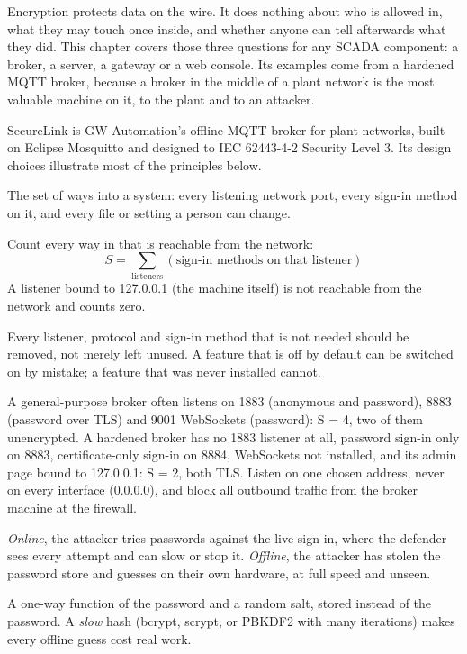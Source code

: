 Encryption protects data on the wire. It does nothing about who is allowed in, what they may touch once inside, and whether anyone can tell afterwards what they did. This chapter covers those three questions for any SCADA component: a broker, a server, a gateway or a web console. Its examples come from a hardened MQTT broker, because a broker in the middle of a plant network is the most valuable machine on it, to the plant and to an attacker.

 SecureLink is GW Automation's offline MQTT broker for plant networks, built on Eclipse Mosquitto and designed to IEC 62443-4-2 Security Level 3. Its design choices illustrate most of the principles below.

 The set of ways into a system: every listening network port, every sign-in method on it, and every file or setting a person can change.

 Count every way in that is reachable from the network:
\[ S = \sum_{\text{listeners}} (\text{sign-in methods on that listener}) \]
A listener bound to 127.0.0.1 (the machine itself) is not reachable from the network and counts zero.

 Every listener, protocol and sign-in method that is not needed should be removed, not merely left unused. A feature that is off by default can be switched on by mistake; a feature that was never installed cannot.

 A general-purpose broker often listens on 1883 (anonymous and password), 8883 (password over TLS) and 9001 WebSockets (password): S = 4, two of them unencrypted. A hardened broker has no 1883 listener at all, password sign-in only on 8883, certificate-only sign-in on 8884, WebSockets not installed, and its admin page bound to 127.0.0.1: S = 2, both TLS. Listen on one chosen address, never on every interface (0.0.0.0), and block all outbound traffic from the broker machine at the firewall.

 \emph{Online}, the attacker tries passwords against the live sign-in, where the defender sees every attempt and can slow or stop it. \emph{Offline}, the attacker has stolen the password store and guesses on their own hardware, at full speed and unseen.

 A one-way function of the password and a random salt, stored instead of the password. A \emph{slow} hash (bcrypt, scrypt, or PBKDF2 with many iterations) makes every offline guess cost real work.


